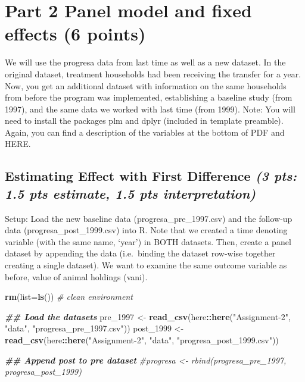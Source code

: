 \documentclass[
]{article}
\newenvironment{Shaded}{\begin{snugshade}}{\end{snugshade}}
\newcommand{\AttributeTok}[1]{\textcolor[rgb]{0.13,0.29,0.53}{#1}}
\newcommand{\CommentTok}[1]{\textcolor[rgb]{0.56,0.35,0.01}{\textit{#1}}}
\newcommand{\DocumentationTok}[1]{\textcolor[rgb]{0.56,0.35,0.01}{\textbf{\textit{#1}}}}
\newcommand{\FunctionTok}[1]{\textcolor[rgb]{0.13,0.29,0.53}{\textbf{#1}}}
\newcommand{\NormalTok}[1]{#1}
\newcommand{\OtherTok}[1]{\textcolor[rgb]{0.56,0.35,0.01}{#1}}
\newcommand{\SpecialCharTok}[1]{\textcolor[rgb]{0.81,0.36,0.00}{\textbf{#1}}}
\newcommand{\StringTok}[1]{\textcolor[rgb]{0.31,0.60,0.02}{#1}}
\begin{document}
\newpage

\hypertarget{part-2-panel-model-and-fixed-effects-6-points}{%
\section{Part 2 Panel model and fixed effects (6
points)}\label{part-2-panel-model-and-fixed-effects-6-points}}

\indent We will use the progresa data from last time as well as a new
dataset. In the original dataset, treatment households had been
receiving the transfer for a year. Now, you get an additional dataset
with information on the same households from before the program was
implemented, establishing a baseline study (from 1997), and the same
data we worked with last time (from 1999). \indent *Note: You will need
to install the packages plm and dplyr (included in template preamble).
Again, you can find a description of the variables at the bottom of PDF
and HERE.

\hypertarget{estimating-effect-with-first-difference-3-pts-1.5-pts-estimate-1.5-pts-interpretation}{%
\subsection{\texorpdfstring{Estimating Effect with First Difference
\emph{(3 pts: 1.5 pts estimate, 1.5 pts
interpretation)}}{Estimating Effect with First Difference (3 pts: 1.5 pts estimate, 1.5 pts interpretation)}}\label{estimating-effect-with-first-difference-3-pts-1.5-pts-estimate-1.5-pts-interpretation}}

Setup: Load the new baseline data (progresa\_pre\_1997.csv) and the
follow-up data (progresa\_post\_1999.csv) into R. Note that we created a
time denoting variable (with the same name, `year') in BOTH datasets.
Then, create a panel dataset by appending the data (i.e.~binding the
dataset row-wise together creating a single dataset). We want to examine
the same outcome variable as before, value of animal holdings (vani).

\begin{Shaded}
\begin{Highlighting}[]
\FunctionTok{rm}\NormalTok{(}\AttributeTok{list=}\FunctionTok{ls}\NormalTok{()) }\CommentTok{\# clean environment}

\DocumentationTok{\#\# Load the datasets}
\NormalTok{pre\_1997 }\OtherTok{\textless{}{-}} \FunctionTok{read\_csv}\NormalTok{(here}\SpecialCharTok{::}\FunctionTok{here}\NormalTok{(}\StringTok{"Assignment{-}2"}\NormalTok{, }\StringTok{"data"}\NormalTok{, }\StringTok{"progresa\_pre\_1997.csv"}\NormalTok{))}
\NormalTok{post\_1999 }\OtherTok{\textless{}{-}} \FunctionTok{read\_csv}\NormalTok{(here}\SpecialCharTok{::}\FunctionTok{here}\NormalTok{(}\StringTok{"Assignment{-}2"}\NormalTok{, }\StringTok{"data"}\NormalTok{, }\StringTok{"progresa\_post\_1999.csv"}\NormalTok{))}

\DocumentationTok{\#\# Append post to pre dataset }
\CommentTok{\#progresa \textless{}{-} rbind(progresa\_pre\_1997, progresa\_post\_1999)}
\end{Highlighting}
\end{Shaded}
\end{document}
